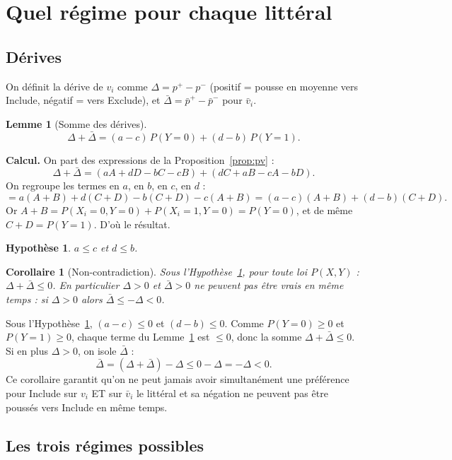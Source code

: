 \documentclass[11pt]{article}
\newtheorem{lemma}{Lemme}
\newtheorem{corollary}{Corollaire}
\newtheorem{hypothesis}{Hypothèse}
\begin{document}
\section{Quel régime pour chaque littéral}

\subsection{Dérives}

On définit la dérive de $v_i$ comme $\Delta = p^+ - p^-$ (positif = pousse en moyenne vers Include, négatif = vers Exclude), et $\bar\Delta = \bar p^+ - \bar p^-$ pour $\bar v_i$.

\begin{lemma}[Somme des dérives]\label{lem:sum}
$$\Delta + \bar\Delta = (a-c)\,P(Y=0) + (d-b)\,P(Y=1).$$
\end{lemma}

\textbf{Calcul.} On part des expressions de la Proposition~\ref{prop:pv} :
$$\Delta + \bar\Delta = (aA + dD - bC - cB) + (dC + aB - cA - bD).$$
On regroupe les termes en $a$, en $b$, en $c$, en $d$ :
$$= a(A+B) + d(C+D) - b(C+D) - c(A+B) = (a-c)(A+B) + (d-b)(C+D).$$
Or $A + B = P(X_i=0,Y=0) + P(X_i=1,Y=0) = P(Y=0)$, et de même $C+D = P(Y=1)$. D'où le résultat.

\begin{hypothesis}\label{hyp:H}
$a \le c$ et $d \le b$.
\end{hypothesis}


\begin{corollary}[Non-contradiction]\label{cor:excl}
Sous l'Hypothèse~\ref{hyp:H}, pour toute loi $P(X,Y)$ : $\Delta + \bar\Delta \le 0$. En particulier $\Delta > 0$ et $\bar\Delta > 0$ ne peuvent pas être vrais en même temps : si $\Delta > 0$ alors $\bar\Delta \le -\Delta < 0$.
\end{corollary}

\textbf{} Sous l'Hypothèse~\ref{hyp:H}, $(a-c) \le 0$ et $(d-b) \le 0$. Comme $P(Y=0) \ge 0$ et $P(Y=1) \ge 0$, chaque terme du Lemme~\ref{lem:sum} est $\le 0$, donc la somme $\Delta + \bar\Delta \le 0$. Si en plus $\Delta > 0$, on isole $\bar\Delta$ :
$$\bar\Delta = (\Delta + \bar\Delta) - \Delta \le 0 - \Delta = -\Delta < 0.$$
Ce corollaire garantit qu'on ne peut jamais avoir simultanément une préférence pour Include sur $v_i$ ET sur $\bar v_i$ le littéral et sa négation ne peuvent pas être poussés vers Include en même temps.

\subsection{Les trois régimes possibles}
\end{document}
